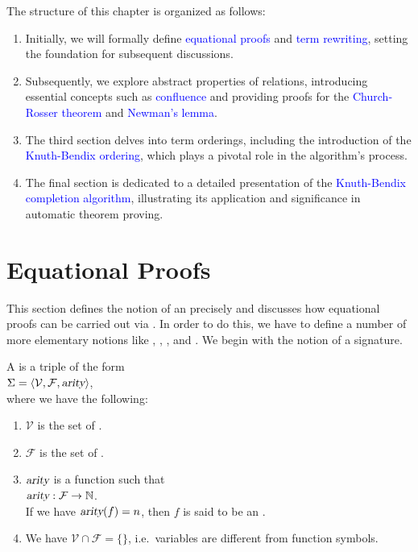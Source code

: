 The structure of this chapter is organized as follows:
\begin{enumerate}
\item Initially, we will formally define \textcolor{blue}{equational proofs} and \textcolor{blue}{term
      rewriting}, setting the foundation for subsequent discussions. 
\item Subsequently, we explore abstract properties of relations, introducing essential concepts such as
      \textcolor{blue}{confluence} and providing proofs for the \textcolor{blue}{Church-Rosser theorem} and
      \textcolor{blue}{Newman's lemma}. 
\item The third section delves into term orderings, including the introduction of the
      \textcolor{blue}{Knuth-Bendix ordering}, which plays a pivotal role in the algorithm's process. 
\item The final section is dedicated to a detailed presentation of the \textcolor{blue}{Knuth-Bendix completion
      algorithm}, illustrating its application and significance in automatic theorem proving. 
\end{enumerate}

\section{Equational Proofs}
This section defines the notion of an  precisely and discusses how equational proofs can
be carried out via .  In order to do this, we have to define a number of more elementary
notions like , , , and .  We begin with 
the notion of a signature.

\begin{Definition}[Signature]
  A   is a triple of the form
  \\[0.2cm]
  \hspace*{1.3cm} $\Sigma = \langle \mathcal{V}, \mathcal{F}, \textsl{arity} \rangle$,
  \\[0.2cm]
  where we have the following: 
  \begin{enumerate}
  \item $\mathcal{V}$ is the set of . 
  \item $\mathcal{F}$ is the set of . 
  \item $\textsl{arity}$ is a function such that
        \\[0.2cm]
        \hspace*{1.3cm}
        $\textsl{arity}: \mathcal{F} \rightarrow \mathbb{N}$.
        \\[0.2cm]
        If we have $\textsl{arity}(f) = n$, then $f$ is said to be an .
  \item We have $\mathcal{V} \cap \mathcal{F} = \{\}$, i.e.~variables are different from function symbols. \eoxs
  \end{enumerate}
\end{Definition}

